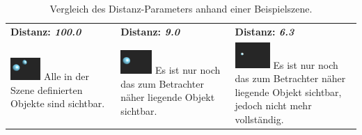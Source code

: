 \begin{table}[H]
    \centering
    \caption{Vergleich des Distanz-Parameters anhand einer Beispielszene.}\label{table:sphere_tracing_distance}
    \begin{tabular}{p{}p{}p{}}
        \toprule
            \textbf{Distanz: \textit{100.0}} &
            \textbf{Distanz: \textit{9.0}}   &
            \textbf{Distanz: \textit{6.3}}   \\
        \cmidrule(r){1-1}\cmidrule(lr){2-2}\cmidrule(l){3-3}
            \includegraphics[width=0.3\textwidth]{img/sphere_tracing_distance_full.pdf}
            \newline
            Alle in der Szene definierten Objekte sind sichtbar. &
            \includegraphics[width=0.3\textwidth]{img/sphere_tracing_distance_less.pdf} \newline
            Es ist nur noch das zum Betrachter näher liegende Objekt sichtbar. &
            \includegraphics[width=0.3\textwidth]{img/sphere_tracing_distance_min.pdf} \newline
            Es ist nur noch das zum Betrachter näher liegende Objekt
            sichtbar, jedoch nicht mehr vollständig. \\
        \bottomrule
    \end{tabular}
\end{table}


